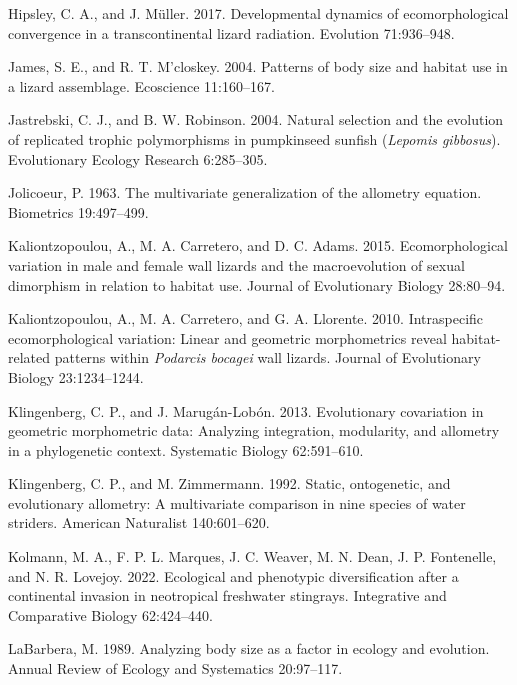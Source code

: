 \documentclass[
  11pt,
]{article}
\begin{document}
\leavevmode\hypertarget{ref-HipsleyMuller2017}{}%
Hipsley, C. A., and J. Müller. 2017. Developmental dynamics of
ecomorphological convergence in a transcontinental lizard radiation.
Evolution 71:936--948.

\leavevmode\hypertarget{ref-James2004}{}%
James, S. E., and R. T. M'closkey. 2004. Patterns of body size and
habitat use in a lizard assemblage. Ecoscience 11:160--167.

\leavevmode\hypertarget{ref-Jastrebski2004}{}%
Jastrebski, C. J., and B. W. Robinson. 2004. Natural selection and the
evolution of replicated trophic polymorphisms in pumpkinseed sunfish
(\emph{Lepomis gibbosus}). Evolutionary Ecology Research 6:285--305.

\leavevmode\hypertarget{ref-Jolicoeur1963}{}%
Jolicoeur, P. 1963. The multivariate generalization of the allometry
equation. Biometrics 19:497--499.

\leavevmode\hypertarget{ref-Kaliontzopoulou2015}{}%
Kaliontzopoulou, A., M. A. Carretero, and D. C. Adams. 2015.
Ecomorphological variation in male and female wall lizards and the
macroevolution of sexual dimorphism in relation to habitat use. Journal
of Evolutionary Biology 28:80--94.

\leavevmode\hypertarget{ref-KALIONTZOPOULOU2010}{}%
Kaliontzopoulou, A., M. A. Carretero, and G. A. Llorente. 2010.
Intraspecific ecomorphological variation: Linear and geometric
morphometrics reveal habitat-related patterns within \emph{Podarcis
bocagei} wall lizards. Journal of Evolutionary Biology 23:1234--1244.

\leavevmode\hypertarget{ref-Klingenberg2013}{}%
Klingenberg, C. P., and J. Marugán-Lobón. 2013. Evolutionary covariation
in geometric morphometric data: Analyzing integration, modularity, and
allometry in a phylogenetic context. Systematic Biology 62:591--610.

\leavevmode\hypertarget{ref-Klingenberg1992}{}%
Klingenberg, C. P., and M. Zimmermann. 1992. Static, ontogenetic, and
evolutionary allometry: A multivariate comparison in nine species of
water striders. American Naturalist 140:601--620.

\leavevmode\hypertarget{ref-Kolmann2022}{}%
Kolmann, M. A., F. P. L. Marques, J. C. Weaver, M. N. Dean, J. P.
Fontenelle, and N. R. Lovejoy. 2022. Ecological and phenotypic
diversification after a continental invasion in neotropical freshwater
stingrays. Integrative and Comparative Biology 62:424--440.

\leavevmode\hypertarget{ref-LaBarbera1989}{}%
LaBarbera, M. 1989. Analyzing body size as a factor in ecology and
evolution. Annual Review of Ecology and Systematics 20:97--117.
\end{document}
